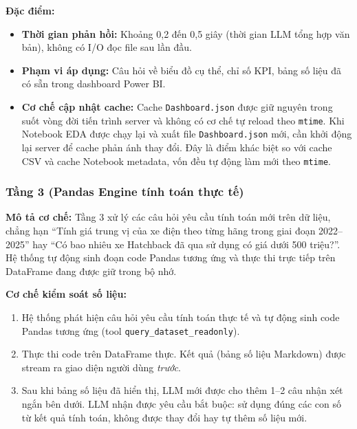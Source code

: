 \noindent\textbf{Đặc điểm:}
\begin{itemize}
    \item \textbf{Thời gian phản hồi:} Khoảng 0{,}2 đến 0{,}5 giây (thời gian LLM tổng hợp văn bản), không có I/O đọc file sau lần đầu.
    \item \textbf{Phạm vi áp dụng:} Câu hỏi về biểu đồ cụ thể, chỉ số KPI, bảng số liệu đã có sẵn trong dashboard Power BI.
    \item \textbf{Cơ chế cập nhật cache:} Cache \texttt{Dashboard.json} được giữ nguyên trong suốt vòng đời tiến trình server và không có cơ chế tự reload theo \texttt{mtime}. Khi Notebook EDA được chạy lại và xuất file \texttt{Dashboard.json} mới, cần khởi động lại server để cache phản ánh thay đổi. Đây là điểm khác biệt so với cache CSV và cache Notebook metadata, vốn đều tự động làm mới theo \texttt{mtime}.
\end{itemize}

\subsubsection{Tầng 3 (Pandas Engine tính toán thực tế)}
\label{subsubsec:tier3_pandas}

\noindent\textbf{Mô tả cơ chế:}
Tầng 3 xử lý các câu hỏi yêu cầu tính toán mới trên dữ liệu, chẳng hạn ``Tính giá trung vị của xe điện theo từng hãng trong giai đoạn 2022--2025'' hay ``Có bao nhiêu xe Hatchback đã qua sử dụng có giá dưới 500 triệu?''. Hệ thống tự động sinh đoạn code Pandas tương ứng và thực thi trực tiếp trên DataFrame đang được giữ trong bộ nhớ.

\noindent\textbf{Cơ chế kiểm soát số liệu:}
\begin{enumerate}
    \item Hệ thống phát hiện câu hỏi yêu cầu tính toán thực tế và tự động sinh code Pandas tương ứng (tool \texttt{query\_dataset\_readonly}).
    \item Thực thi code trên DataFrame thực. Kết quả (bảng số liệu Markdown) được stream ra giao diện người dùng \emph{trước}.
    \item Sau khi bảng số liệu đã hiển thị, LLM mới được cho thêm 1--2 câu nhận xét ngắn bên dưới. LLM nhận được yêu cầu bắt buộc: sử dụng đúng các con số từ kết quả tính toán, không được thay đổi hay tự thêm số liệu mới.
\end{enumerate}

